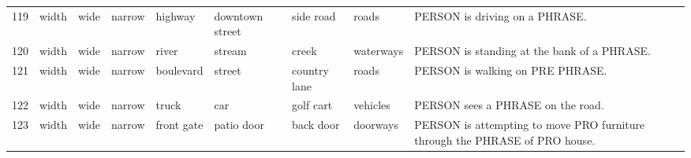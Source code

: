 \documentclass[]{article}
\begin{document}
\begin{longtable}[t]{lllllll>{\raggedright\arraybackslash}p{1.5in}>{\raggedright\arraybackslash}p{3in}}
119 & width & wide & narrow & highway & downtown street & side road & roads & PERSON is driving on a PHRASE.\\
\rowcolor{gray!6}  120 & width & wide & narrow & river & stream & creek & waterways & PERSON is standing at the bank of a PHRASE.\\
121 & width & wide & narrow & boulevard & street & country lane & roads & PERSON is walking on PRE PHRASE.\\
\addlinespace
\rowcolor{gray!6}  122 & width & wide & narrow & truck & car & golf cart & vehicles & PERSON sees a PHRASE on the road.\\
123 & width & wide & narrow & front gate & patio door & back door & doorways & PERSON is attempting to move PRO furniture through the PHRASE of PRO house.\\*
\end{longtable}
\end{document}
